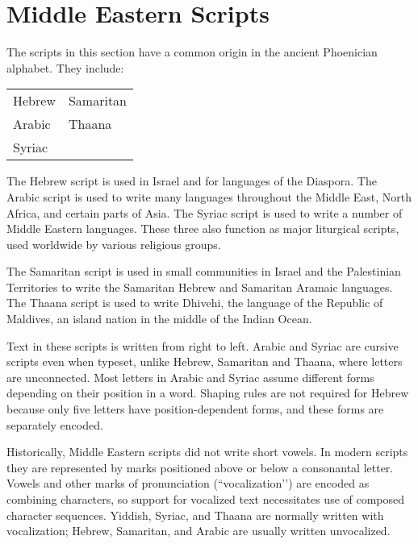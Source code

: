 \chapter{Middle Eastern Scripts}

The scripts in this section have a common origin in the ancient Phoenician alphabet. They include:

\begin{center}
\begin{tabular}{ll}
Hebrew & Samaritan\\
Arabic & Thaana\\
Syriac &\\
\end{tabular}
\end{center}

The Hebrew script is used in Israel and for languages of the Diaspora. The Arabic script is
used to write many languages throughout the Middle East, North Africa, and certain parts
of Asia. The Syriac script is used to write a number of Middle Eastern languages. These
three also function as major liturgical scripts, used worldwide by various religious groups.

The Samaritan script is used in small communities in Israel and the Palestinian Territories
to write the Samaritan Hebrew and Samaritan Aramaic languages. The Thaana script is
used to write Dhivehi, the language of the Republic of Maldives, an island nation in the
middle of the Indian Ocean. 

Text in these scripts is written from right to left. Arabic and Syriac are cursive scripts even when typeset, unlike Hebrew, Samaritan  and Thaana, where letters are unconnected. Most letters in Arabic and Syriac assume different forms depending on their position in a word. Shaping rules are not required for Hebrew because only five letters have position-dependent forms, and these forms are separately encoded.

Historically, Middle Eastern  scripts did not write short vowels. In modern scripts they are represented  by marks positioned above or below a consonantal letter. Vowels and other
marks of pronunciation (``vocalization’’) are encoded as combining characters, so support
for vocalized text necessitates use of composed character sequences. Yiddish, Syriac, and
Thaana are normally written with vocalization; Hebrew, Samaritan, and Arabic are usually written unvocalized. 















\endinput










